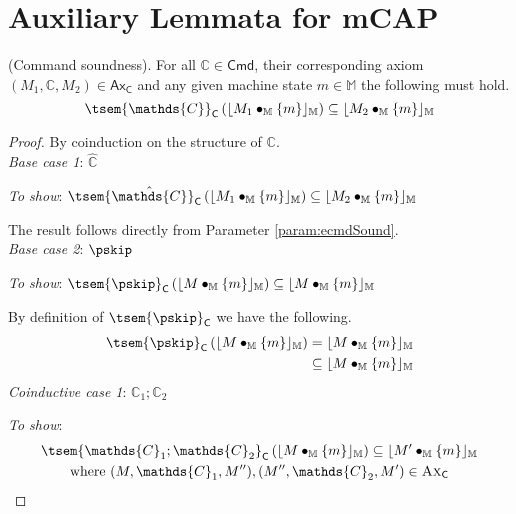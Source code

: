\chapter{Auxiliary Lemmata for mCAP}

\thm \label{thm:cSound} (Command soundness). For all $\mathds{C} \in \mathsf{Cmd}$, their corresponding axiom $(M_1, \mathds{C}, M_2) \in \mathsf{Ax}_\mathsf{C}$ and any given machine state $m \in \mathbb{M}$ the following must hold.
\[
	\tsem{\mathds{C}}_\mathsf{C} \left( \lfloor M_1 \bullet_\mathbb{M} \{m\} \rfloor_\mathbb{M} \right) \subseteq \lfloor M_2 \bullet_\mathbb{M} \{m\} \rfloor_\mathbb{M}
\]

{\parindent0pt
\begin{proof}
By coinduction on the structure of $\mathds{C}$. \\
\indline
\textit{Base case 1}: $\mathds{\hat{C}}$

\textit{To show}: $\tsem{\hat{\mathds{C}}}_\mathsf{C} \left( \lfloor M_1 \bullet_\mathbb{M} \{m\} \rfloor_\mathbb{M} \right) \subseteq \lfloor M_2 \bullet_\mathbb{M} \{m\} \rfloor_\mathbb{M}$

The result follows directly from Parameter \ref{param:ecmdSound}. \\
\indline
\textit{Base case 2}: $\pskip$

\textit{To show}: $\tsem{\pskip}_\mathsf{C} \left( \lfloor M \bullet_\mathbb{M} \{m\} \rfloor_\mathbb{M}\right) \subseteq \lfloor M \bullet_\mathbb{M} \{m\} \rfloor_\mathbb{M}$

By definition of $\tsem{\pskip}_\mathsf{C}$ we have the following.
\begin{align*}
	\tsem{\pskip}_\mathsf{C} \left( \lfloor M \bullet_\mathbb{M} \{m\} \rfloor_\mathbb{M} \right)
	&=
	\lfloor M \bullet_\mathbb{M} \{m\} \rfloor_\mathbb{M}
	\\
	&\subseteq \lfloor M \bullet_\mathbb{M} \{m\} \rfloor_\mathbb{M}
\end{align*} 
\indline
\textit{Coinductive case 1}: $\mathds{C}_1 ; \mathds{C}_2$

\textit{To show}:
\begin{gather*}
	\tsem{\mathds{C}_1 ; \mathds{C}_2}_\mathsf{C} \left( \lfloor M \bullet_\mathbb{M} \{m\} \rfloor_\mathbb{M} \right) \subseteq \lfloor M' \bullet_\mathbb{M} \{m\} \rfloor_\mathbb{M}
	\\
	\text{where } (M, \mathds{C}_1, M''), (M'', \mathds{C}_2, M') \in \textsc{Ax}_\mathsf{C}
\end{gather*}


\end{proof}}
